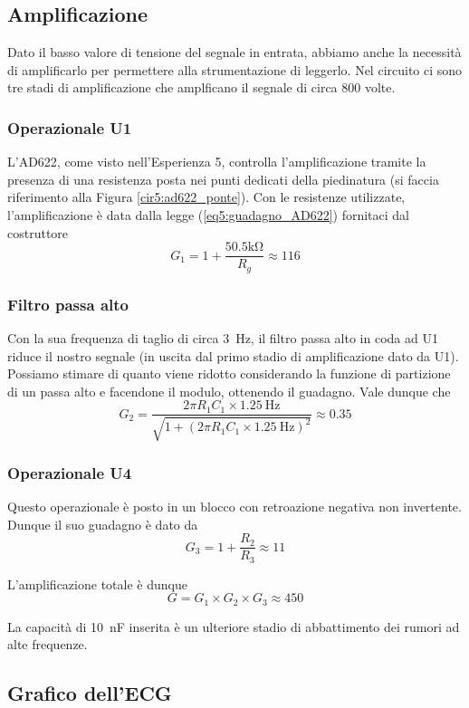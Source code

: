 \subsection{Amplificazione}

Dato il basso valore di tensione del segnale in entrata, abbiamo anche la necessità di amplificarlo per permettere alla strumentazione di leggerlo. Nel circuito ci sono tre stadi di amplificazione che amplficano il segnale di circa 800 volte.

\subsubsection*{Operazionale U1}
L'AD622, come visto nell'Esperienza 5, controlla l'amplificazione tramite la presenza di una resistenza posta nei punti dedicati della piedinatura (si faccia riferimento alla Figura \ref{cir5:ad622_ponte}). Con le resistenze utilizzate, l'amplificazione è data dalla legge (\ref{eq5:guadagno_AD622}) fornitaci dal costruttore
$$G_1=1+\frac{50.5 \si{\kilo\ohm}}{R_g} \approx 116$$

\subsubsection*{Filtro passa alto}
Con la sua frequenza di taglio di circa \SI{3}{\Hz}, il filtro passa alto in coda ad U1 riduce il nostro segnale (in uscita dal primo stadio di amplificazione dato da U1). Possiamo stimare di quanto viene ridotto considerando la funzione di partizione di un passa alto e facendone il modulo, ottenendo il guadagno. Vale dunque che
$$G_2=\frac{2 \pi R_1 C_1 \times \SI{1.25}{\Hz}}{\sqrt{1+(2 \pi R_1 C_1 \times \SI{1.25}{\Hz})^2}}\approx 0.35$$

\subsubsection*{Operazionale U4}
Questo operazionale è posto in un blocco con retroazione negativa non invertente. Dunque il suo guadagno è dato da
$$G_3=1+\frac{R_2}{R_3} \approx 11$$

L'amplificazione totale è dunque
$$G = G_1 \times G_2 \times G_3 \approx 450$$

La capacità di \SI{10}{\nano\farad} inserita è un ulteriore stadio di abbattimento dei rumori ad alte frequenze.

\subsection{Grafico dell'ECG}

